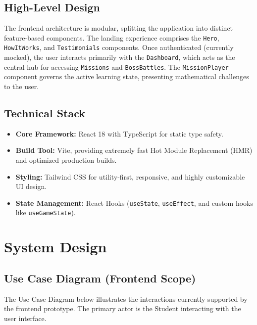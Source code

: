 \documentclass[12pt,a4paper]{report}
\begin{document}
\subsection{High-Level Design}
The frontend architecture is modular, splitting the application into distinct feature-based components. The landing experience comprises the \texttt{Hero}, \texttt{HowItWorks}, and \texttt{Testimonials} components. Once authenticated (currently mocked), the user interacts primarily with the \texttt{Dashboard}, which acts as the central hub for accessing \texttt{Missions} and \texttt{BossBattles}. The \texttt{MissionPlayer} component governs the active learning state, presenting mathematical challenges to the user.

\subsection{Technical Stack}
\begin{itemize}
    \item \textbf{Core Framework:} React 18 with TypeScript for static type safety.
    \item \textbf{Build Tool:} Vite, providing extremely fast Hot Module Replacement (HMR) and optimized production builds.
    \item \textbf{Styling:} Tailwind CSS for utility-first, responsive, and highly customizable UI design.
    \item \textbf{State Management:} React Hooks (\texttt{useState}, \texttt{useEffect}, and custom hooks like \texttt{useGameState}).
\end{itemize}

\section{System Design}

\subsection{Use Case Diagram (Frontend Scope)}
The Use Case Diagram below illustrates the interactions currently supported by the frontend prototype. The primary actor is the Student interacting with the user interface.
\end{document}
